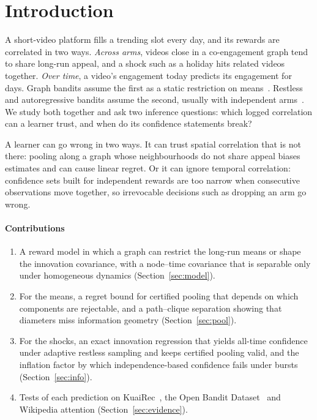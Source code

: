 \documentclass[conference]{IEEEtran}
\begin{document}
\section{Introduction}

A short-video platform fills a trending slot every day, and its rewards are correlated in two ways. \emph{Across arms}, videos close in a co-engagement graph tend to share long-run appeal, and a shock such as a holiday hits related videos together. \emph{Over time}, a video's engagement today predicts its engagement for days. Graph bandits assume the first as a static restriction on means~\cite{valko2014spectral,ban2021local}. Restless and autoregressive bandits assume the second, usually with independent arms~\cite{chen2023autoregressive,trella2025latent}. We study both together and ask two inference questions: which logged correlation can a learner trust, and when do its confidence statements break?

A learner can go wrong in two ways. It can trust spatial correlation that is not there: pooling along a graph whose neighbourhoods do not share appeal biases estimates and can cause linear regret. Or it can ignore temporal correlation: confidence sets built for independent rewards are too narrow when consecutive observations move together, so irrevocable decisions such as dropping an arm go wrong.

\paragraph*{Contributions}
\begin{enumerate}
\item A reward model in which a graph can restrict the long-run means or shape the innovation covariance, with a node--time covariance that is separable only under homogeneous dynamics (Section~\ref{sec:model}).
\item For the means, a regret bound for certified pooling that depends on which components are rejectable, and a path--clique separation showing that diameters miss information geometry (Section~\ref{sec:pool}).
\item For the shocks, an exact innovation regression that yields all-time confidence under adaptive restless sampling and keeps certified pooling valid, and the inflation factor by which independence-based confidence fails under bursts (Section~\ref{sec:info}).
\item Tests of each prediction on KuaiRec~\cite{gao2022kuairec}, the Open Bandit Dataset~\cite{saito2021obd} and Wikipedia attention (Section~\ref{sec:evidence}).
\end{enumerate}
\end{document}
